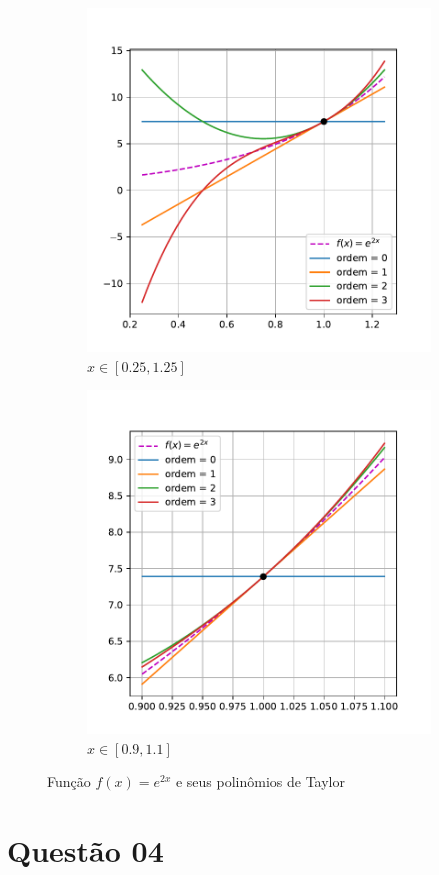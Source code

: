 \documentclass[10pt, a4paper]{article}
\begin{document}
\begin{figure}
\begin{subfigure}[b]{0.45\textwidth}
        \includegraphics[width=\textwidth]{images/q3_plot_zoom.pdf}
        \caption{$x \in [0.25, 1.25]$}
        \label{fig:q3_2}
    \end{subfigure}
    \hfill
    \begin{subfigure}[b]{0.45\textwidth}
        \centering
        \includegraphics[width=\textwidth]{images/q3_plot_zoom2.pdf}
        \caption{$x \in [0.9, 1.1]$}
        \label{fig:q3_3}
    \end{subfigure}
       \caption{Função $f(x) = e^{2x}$ e seus polinômios de Taylor}
       \label{fig:q3}
\end{figure}

\section[q04]{Questão 04}



\end{document}

